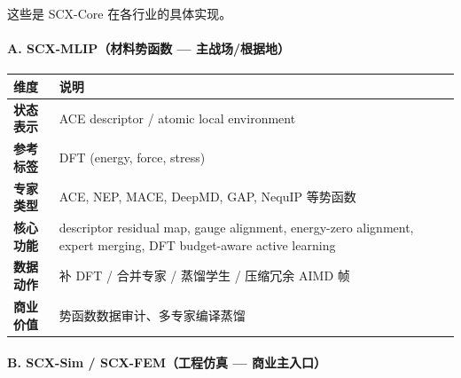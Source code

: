 \documentclass[
  12pt,
]{ctexart}
\begin{document}
这些是 SCX-Core 在各行业的具体实现。

\paragraph{A. SCX-MLIP（材料势函数 ---
主战场/根据地）}\label{a.-scx-mlipux6750ux6599ux52bfux51fdux6570-ux4e3bux6218ux573aux6839ux636eux5730}

\begin{longtable}[]{@{}
  >{\raggedright\arraybackslash}p{}
  >{\raggedright\arraybackslash}p{}@{}}
\toprule\noalign{}
\begin{minipage}[b]{\linewidth}\raggedright
维度
\end{minipage} & \begin{minipage}[b]{\linewidth}\raggedright
说明
\end{minipage} \\
\midrule\noalign{}
\endhead
\bottomrule\noalign{}
\endlastfoot
\textbf{状态表示} & ACE descriptor / atomic local environment \\
\textbf{参考标签} & DFT (energy, force, stress) \\
\textbf{专家类型} & ACE, NEP, MACE, DeepMD, GAP, NequIP 等势函数 \\
\textbf{核心功能} & descriptor residual map, gauge alignment,
energy-zero alignment, expert merging, DFT budget-aware active
learning \\
\textbf{数据动作} & 补 DFT / 合并专家 / 蒸馏学生 / 压缩冗余 AIMD 帧 \\
\textbf{商业价值} & 势函数数据审计、多专家编译蒸馏 \\
\end{longtable}

\paragraph{B. SCX-Sim / SCX-FEM（工程仿真 ---
商业主入口）}\label{b.-scx-sim-scx-femux5de5ux7a0bux4effux771f-ux5546ux4e1aux4e3bux5165ux53e3}
\end{document}
